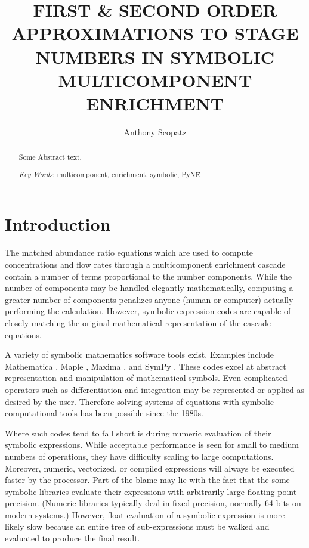 \documentclass{ansconf}
\begin{document}
\title{FIRST \& SECOND ORDER APPROXIMATIONS TO STAGE NUMBERS IN SYMBOLIC 
       MULTICOMPONENT ENRICHMENT}

\author{Anthony Scopatz}

\maketitle

\begin{abstract}
\raggedright
Some Abstract text.

\emph{Key Words}: multicomponent, enrichment, symbolic, PyNE
\end{abstract}

\section{Introduction}
\label{sec:intro}

The matched abundance ratio equations which are used to compute concentrations and 
flow rates through a multicomponent enrichment cascade contain a number of terms 
proportional to the number components.  While the number of components may be 
handled elegantly mathematically, computing a greater number of components 
penalizes anyone (human or computer) actually performing the 
calculation.  However, 
symbolic expression codes are capable of closely matching the original 
mathematical representation of the cascade equations.

A variety of symbolic mathematics software tools exist. Examples include  
Mathematica \cite{Wolfram2008}, Maple \cite{Maple16},  Maxima \cite{Maxima5}, 
and SymPy \cite{SymPy2012}.  These codes excel at abstract representation and 
manipulation of mathematical symbols.  Even complicated operators such as 
differentiation and integration may be represented or applied as desired by the 
user.  Therefore solving systems of equations with symbolic computational tools
has been possible since the 1980s.

Where such codes tend to fall short is during numeric evaluation of 
their symbolic expressions.  While acceptable performance is seen 
for small to medium numbers of 
operations, they have difficulty scaling to large computations.  Moreover, 
numeric, vectorized, or compiled expressions will always be executed faster
by the processor.  Part of the blame may lie with the fact that the some symbolic 
libraries evaluate their 
expressions with arbitrarily large floating point precision.  (Numeric libraries
typically deal in fixed precision, normally 64-bits on modern systems.)  However, 
float evaluation of a symbolic expression is more likely slow because an entire 
tree of sub-expressions must be walked and evaluated to produce the final result.
\end{document}
